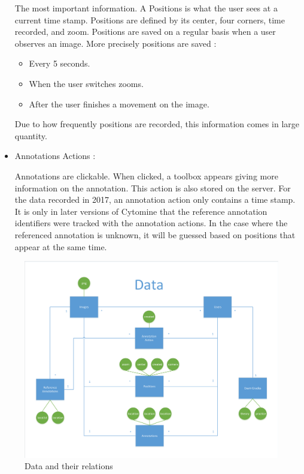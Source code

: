 \documentclass[a4paper,11pt]{report}
\numberwithin{figure}{section} %
\begin{document}
\begin{itemize}
         The most important information.
         A Positions is what the user sees at a current time stamp.
         Positions are defined by its center, four corners, time recorded, and zoom.
         Positions are saved on a regular basis when a user observes an image.
         More precisely positions are saved :
         \begin{itemize}
         	\item[\textbullet] Every 5 seconds.
            \item[\textbullet] When the user switches zooms.
            \item[\textbullet] After the user finishes a movement on the image.
         \end{itemize}
         Due to how frequently positions are recorded, this information comes in large quantity.
        \\
        \item[\textbullet] Annotations Actions :\newline
        
        Annotations are clickable.
        When clicked, a toolbox appears giving more information on the annotation.
        This action is also stored on the server.
        For the data recorded in 2017, an annotation action only contains a time stamp.
        It is only in later versions of Cytomine that the reference annotation identifiers were tracked with the annotation actions.
        In the case where the referenced annotation is unknown, it will be guessed based on positions that appear at the same time.
        
         \end{itemize}

       \begin{figure}[H]
        \centering
         \includegraphics[width=.9\linewidth]{dataDiagram.pdf}
         \caption{Data and their relations}
         \label{fig:data}
       \end{figure}
\end{document}
